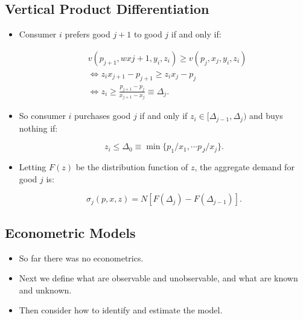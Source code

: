 \documentclass[]{book}
\providecommand{\tightlist}{%
  \setlength{\itemsep}{0pt}\setlength{\parskip}{0pt}}
\begin{document}
\subsection{Vertical Product
Differentiation}\label{vertical-product-differentiation-1}

\begin{itemize}
\tightlist
\item
  Consumer \(i\) prefers good \(j + 1\) to good \(j\) if and only if:

  \begin{equation}
  \begin{split}
  &v(p_{j + 1}, wx{j + 1}, y_i, z_i) \ge v(p_j, x_j, y_i, z_i)\\
  &\Leftrightarrow z_i x_{j + 1} - p_{j + 1} \ge z_i x_j - p_j\\
  &\Leftrightarrow z_i \ge \frac{p_{j + 1} - p_j}{x_{j + 1} - x_j} \equiv \Delta_j.
  \end{split}
  \end{equation}
\item
  So consumer \(i\) purchases good \(j\) if and only if
  \(z_i \in [\Delta_{j - 1}, \Delta_j)\) and buys nothing if:

  \begin{equation}
  z_i \le \Delta_0 \equiv \min\{p_1/x_1, \cdots p_J/x_j\}.
  \end{equation}
\item
  Letting \(F(z)\) be the distribution function of \(z\), the aggregate
  demand for good \(j\) is:

  \begin{equation}
  \sigma_j(p, x, z) = N[F(\Delta_{j}) - F(\Delta_{j - 1})].
  \end{equation}
\end{itemize}

\subsection{Econometric Models}\label{econometric-models}

\begin{itemize}
\tightlist
\item
  So far there was no econometrics.
\item
  Next we define what are observable and unobservable, and what are
  known and unknown.
\item
  Then consider how to identify and estimate the model.
\end{itemize}
\end{document}
